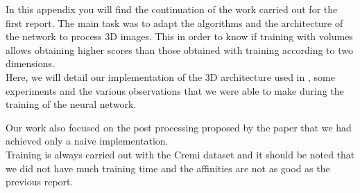 In this appendix you will find the continuation of the work carried out for the first report. The main task was to adapt the algorithms and the architecture of the network to process 3D images. This in order to know if training with volumes allows obtaining higher scores than those obtained with training according to two dimensions.\\

Here, we will detail our implementation of the 3D architecture used in \cite{funke_large_2019}, some experiments and the various observations that we were able to make during the training of the neural network.

Our work also focused on the post processing proposed by the paper that we had achieved only a naive implementation.\\
Training is always carried out with the Cremi dataset and it should be noted that we did not have much training time and the affinities are not as good as the previous report.